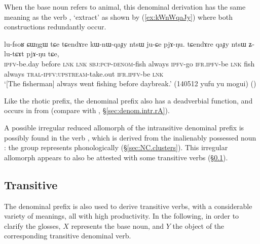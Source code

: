 When the base noun refers to animal, this denominal derivation has the same meaning as the verb , `extract' as shown by (\ref{ex:kWnWqaJy}) where both constructions redundantly occur.
 
\begin{exe}
\ex \label{ex:kWnWqaJy}
\gll lu-fsoʁ ɕɯŋgɯ tɕe tɕendɤre kɯ-nɯ-qaɟy ntsɯ ju-ɕe pjɤ-ŋu. tɕendɤre qaɟy ntsɯ ʑ-lu-tɕɤt pjɤ-ŋu tɕe, \\
\textsc{ipfv}-be.day before \textsc{lnk} \textsc{lnk} \textsc{sbj}:\textsc{pcp}-\textsc{denom}-fish always \textsc{ipfv}-go \textsc{ifr}.\textsc{ipfv}-be \textsc{lnk} fish always \textsc{tral}-\textsc{ipfv}:\textsc{upstream}-take.out \textsc{ifr}.\textsc{ipfv}-be  \textsc{lnk} \\
\glt `[The fisherman] always went fishing before daybreak.' (140512 yufu yu mogui)
()
\end{exe}

Like the rhotic prefix, the  denominal prefix also has a deadverbial function, and occurs in  from  (compare with  , §\ref{sec:denom.intr.rA}).
  
A possible irregular reduced allomorph  of the intransitive denominal  prefix is possibly found in the verb , which is derived from the inalienably possessed noun : the group  represents  phonologically (§\ref{sec:NC.clusters}). This irregular allomorph appears to also be attested with some transitive verbs (§\ref{sec:denom.tr.nW}).

\subsection{Transitive}   \label{sec:denom.tr.nW}
The  denominal prefix is also used to derive transitive verbs, with a considerable variety of meanings, all with high productivity. In the following, in order to clarify the glosses, $X$ represents the base noun, and $Y$ the object of the corresponding transitive  denominal verb.

